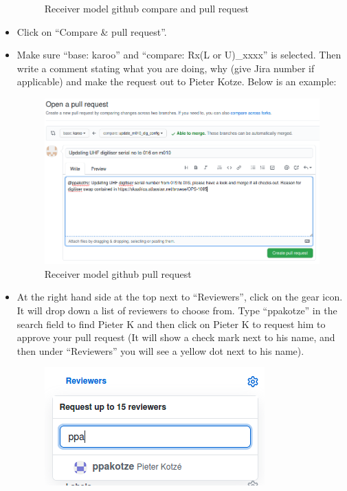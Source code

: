 \begin{itemize}
\begin{figure}[!thb]
	\caption{Receiver model github compare and pull request}
	\label{fig:image108}
\end{figure}

\item Click on “Compare \& pull request”.
\item Make sure “base: karoo” and “compare: Rx(L or U)\_xxxx” is selected. Then write a comment stating what you are doing, why (give Jira number if applicable) and make the request out to Pieter Kotze. Below is an example:

\begin{figure}[!thb]
	\centering
	\includegraphics[scale=0.5]{Chapters/images/image81.png}
	
	\caption{Receiver model github pull request}
	\label{fig:image81}
\end{figure}
\item At the right hand side at the top next to “Reviewers”, click on the gear icon. It will drop down a list of reviewers to choose from. Type “ppakotze” in the search field to find Pieter K and then click on Pieter K to request him to approve your pull request (It will show a check mark next to his name, and then under “Reviewers” you will see a yellow dot next to his name).

\begin{figure}[!thb]
	\centering
	\includegraphics[scale=0.9]{Chapters/images/image57.png}
	

\end{figure}
\end{itemize}
